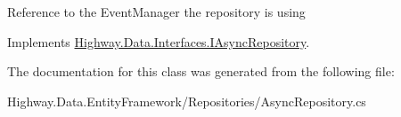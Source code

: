 Reference to the Event\-Manager the repository is using 



Implements \hyperlink{interface_highway_1_1_data_1_1_interfaces_1_1_i_async_repository_ad3c1510134e22665788e2f8eccd954f0}{Highway.\-Data.\-Interfaces.\-I\-Async\-Repository}.



The documentation for this class was generated from the following file\-:\begin{DoxyCompactItemize}
\item 
Highway.\-Data.\-Entity\-Framework/\-Repositories/Async\-Repository.\-cs\end{DoxyCompactItemize}
